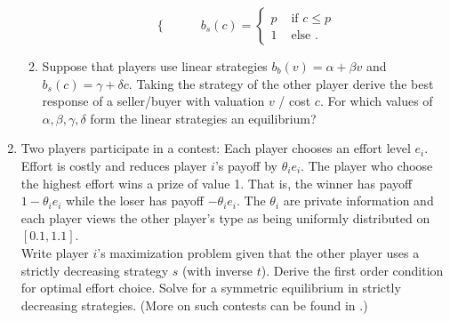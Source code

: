 \documentclass[a4paper,12pt]{article}
\begin{document}
\begin{enumerate}
\begin{enumerate}
\begin{equation*}
\begin{cases}
      \end{cases}
    \qquad
      b_s(c)=
      \begin{cases}
        p & \text{ if }c\leq p\\
        1 & \text{ else }.
      \end{cases}
    \end{equation*}
    \item Suppose that players use linear strategies $b_b(v)=\alpha+\beta v$ and $b_s(c)=\gamma+\delta c$. Taking the strategy of the other player derive the best response of a seller/buyer with valuation $v$ / cost $c$. For which values of $\alpha,\beta,\gamma,\delta$ form the linear strategies an equilibrium?
    \end{enumerate}
  \item Two players participate in a contest: Each player chooses an effort level $e_i$. Effort is costly and reduces player $i$'s payoff by  $\theta _ie_i$. The player who choose the highest effort wins a prize of value 1. That is, the winner has payoff $1-\theta _i e_i$ while the loser has payoff $-\theta _i e_i$. The $\theta _i$ are private information and each player views the other player's type as being uniformly distributed on $[0.1,1.1]$. \\
    Write player $i$'s maximization problem given that the other player uses a strictly decreasing strategy $s$ (with inverse $t$). Derive the first order condition for optimal effort choice. Solve for a symmetric equilibrium in strictly decreasing strategies.
    (More on such contests can be found in \cite{moldovanu2001optimal}.)
\end{enumerate}



\end{document}
